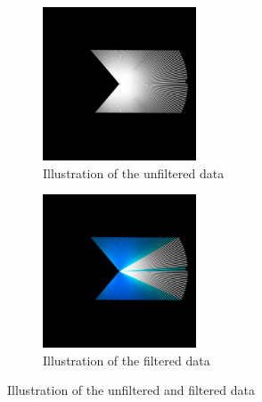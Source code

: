\documentclass[../Head/Main.tex]{subfiles}
\begin{document}
\begin{figure}[H]
  \begin{subfigure}[b]{0.49\textwidth}
    \centering
    \includegraphics[width=0.5\textwidth]{Lidar/Lidar_visualise_unsorted_points}
    \caption{Illustration of the unfiltered data}
    \label{fig:white_lines}
  \end{subfigure}
  \hfill
  \begin{subfigure}[b]{0.49\textwidth}
  	\centering
    \includegraphics[width=0.5\textwidth]{Lidar/Lidar_visualise_sorted_points}
    \caption{Illustration of the filtered data}
    \label{fig:blue_lines}
  \end{subfigure}
  \caption{Illustration of the unfiltered and filtered data}
\end{figure}
\end{document}
